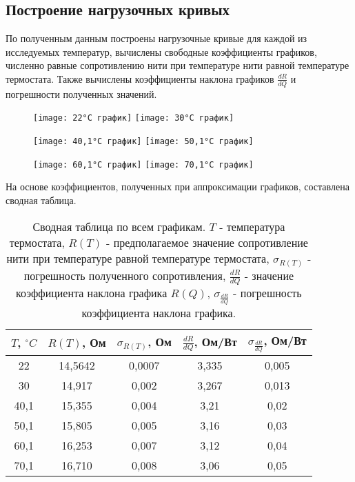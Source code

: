 \documentclass[a4paper,14pt]{article}
\begin{document}
\subsection{Построение нагрузочных кривых}

По полученным данным построены нагрузочные кривые для каждой из исследуемых температур, вычислены свободные коэффициенты графиков, численно равные сопротивлению нити при температуре нити равной температуре термостата. Также вычислены коэффициенты наклона графиков $\frac{dR}{dQ}$ и погрешности полученных значений.

\begin{figure}[H]
\begin{floatrow}
\ffigbox{\caption{}\label{}}
{\texttt{[image: 22°C график]}}
\ffigbox{\caption{}\label{}}
{\texttt{[image: 30°С график]}}        
\end{floatrow}
\end{figure}	

\begin{figure}[H]
\begin{floatrow}
\ffigbox{\caption{}\label{}}
{\texttt{[image: 40,1°C график]}}
\ffigbox{\caption{}\label{}}
{\texttt{[image: 50,1°C график]}}        
\end{floatrow}
\end{figure}	

\begin{figure}[H]
\begin{floatrow}
\ffigbox{\caption{}\label{}}
{\texttt{[image: 60,1°C график]}}
\ffigbox{\caption{}\label{}}
{\texttt{[image: 70,1°C график]}}        
\end{floatrow}
\end{figure}

На основе коэффициентов, полученных при аппроксимации графиков, составлена сводная таблица. 
\begin{table}[H]
\caption{Сводная таблица по всем графикам. $T$ - температура термостата, $R(T)$ - предполагаемое значение сопротивление нити при температуре равной температуре термостата, $\sigma_{R(T)}$ - погрешность полученного сопротивления, $\frac{dR}{dQ}$ - значение коэффициента наклона графика $R(Q)$, $\sigma_{\frac{dR}{dQ}}$ - погрешность коэффициента наклона графика.}
\label{}
\begin{tabular}{|c|c|c|c|c|}
\hline
$T$, $^{\circ}C$ & $R(T)$, Ом & $\sigma_{R(T)}$, Ом & $\frac{dR}{dQ}$, Ом/Вт & $\sigma_{\frac{dR}{dQ}}$, Ом/Вт \\ \hline
22   & 14,5642 & 0,0007 & 3,335 & 0,005 \\ \hline
30   & 14,917  & 0,002  & 3,267 & 0,013 \\ \hline
40,1 & 15,355  & 0,004  & 3,21  & 0,02  \\ \hline
50,1 & 15,805  & 0,005  & 3,16  & 0,03  \\ \hline
60,1 & 16,253  & 0,007  & 3,12  & 0,04  \\ \hline
70,1 & 16,710  & 0,008  & 3,06  & 0,05  \\ \hline
\end{tabular}
\end{table}
\end{document}
